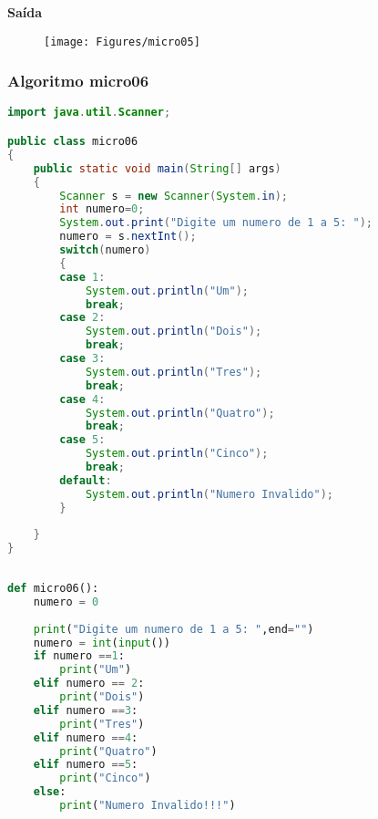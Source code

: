 \documentclass[hidelinks,12pt]{article}
\begin{document}
	{\large{\textbf{Saída}}}
	
	\begin{figure}[!h]
		\centering
		\texttt{[image: Figures/micro05]}
	\end{figure}
	
	\subsubsection{Algoritmo micro06}
	
	\begin{lstlisting}[caption=Código em Java,language=java]
import java.util.Scanner;

public class micro06
{
	public static void main(String[] args)
	{
		Scanner s = new Scanner(System.in);
		int numero=0;
		System.out.print("Digite um numero de 1 a 5: ");
		numero = s.nextInt();
		switch(numero)
		{
		case 1:
			System.out.println("Um");
			break;
		case 2:
			System.out.println("Dois");
			break;
		case 3:
			System.out.println("Tres");
			break;
		case 4:
			System.out.println("Quatro");
			break;
		case 5:
			System.out.println("Cinco");
			break;
		default:
			System.out.println("Numero Invalido");
		}
	
	}
}	
	
	\end{lstlisting}
	
	\begin{lstlisting}[caption=Código em python,language=Python]
def micro06():
	numero = 0
	
	print("Digite um numero de 1 a 5: ",end="")
	numero = int(input())
	if numero ==1: 
		print("Um")
	elif numero == 2:
		print("Dois")
	elif numero ==3:
		print("Tres")
	elif numero ==4:
		print("Quatro")
	elif numero ==5:
		print("Cinco")
	else:
		print("Numero Invalido!!!")
	
	
	\end{lstlisting}
	
\end{document}
